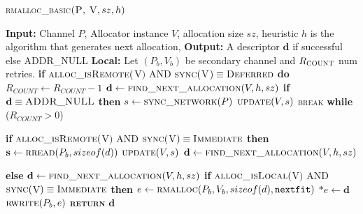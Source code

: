 \documentclass[10pt]{article}
\begin{document}




\begin{algorithm}{}
\footnotesize
\caption{\textsc{rmalloc\_basic}{$\textsc{(P, V}, sz, h)$}}
\label{alg:rmalloc} 
\begin{algorithmic}[1]


\STATE \textbf{Input:} Channel $P$, Allocator instance $V$, allocation size $sz$, heuristic $h$
is the algorithm that generates next allocation, 
\STATE \textbf{Output:} A descriptor {$\textbf{d}$} if successful else \textsc{ADDR\_NULL}
\STATE \textbf{Local:} Let $(P_{b}, V_{b})$ be secondary channel and $R_{\textsc{COUNT}}$ num retries.
\STATE \textbf{if} $\textsc{alloc\_isRemote}($V$)$ AND $\textsc{sync}($V$) \equiv \textsc{Deferred}$ 
\STATE \quad \textbf{do}
\STATE \qquad $R_{COUNT} \gets R_{COUNT}-1$
\STATE \qquad $\textbf{d} \leftarrow  \textsc{find\_next\_allocation}(V, h, sz)$ 
\STATE \qquad \textbf{if} $\textbf{d} \equiv \textsc{ADDR\_NULL}$ \textbf{then}
\STATE \qquad \quad $s \gets \textsc{sync\_network}(P)$
\STATE \qquad \quad $\textsc{update}(V, s)$
\STATE \qquad \quad \textsc{break}
\STATE \quad \textbf{while} ($R_{COUNT} > 0$)

\STATE \textbf{if} $\textsc{alloc\_isRemote}($V$)$ AND $\textsc{sync}($V$) \equiv \textsc{Immediate}$ \textbf{then}
\STATE \quad $\textbf{s} \gets \textsc{rread}(P_{b}, sizeof(d))$ 
\STATE \quad $\textsc{update}(V, s)$
\STATE \quad $\textbf{d} \gets \textsc{find\_next\_allocation}(V, h, sz)$ 

\STATE \textbf{else}
\STATE \quad $\textbf{d} \gets \textsc{find\_next\_allocation}(V, h, sz)$ 
\STATE \quad \textbf{if} $\textsc{alloc\_isLocal}($V$)$ AND $\textsc{sync}($V$) \equiv \textsc{Immediate}$ \textbf{then}
\STATE \qquad $e \gets \textsc{rmalloc}(P_{b}, V_{b}, sizeof(d), \texttt{nextfit})$
\STATE \qquad $*e \gets \textbf{d}$
\STATE \qquad $\textsc{rwrite}(P_{b}, e)$ 
\STATE \textsc{\textbf{return}} {$\textbf{d}$}

\end{algorithmic}
\end{algorithm}
\end{document}
